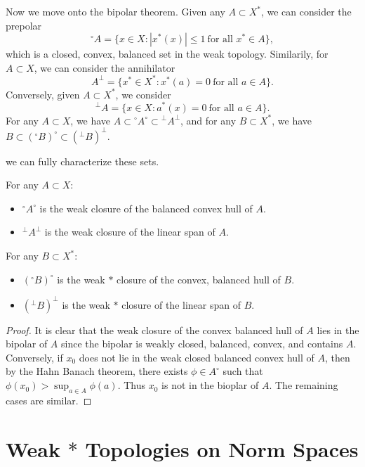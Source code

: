 Now we move onto the bipolar theorem. Given any $A \subset X^*$, we can consider the prepolar
%
\[ {}^\circ A = \{ x \in X : |x^*(x)| \leq 1\ \text{for all $x^* \in A$} \}, \]
%
which is a closed, convex, balanced set in the weak topology. Similarily, for $A \subset X$, we can consider the annihilator
%
\[ A^\perp = \{ x^* \in X^* : x^*(a) = 0\ \text{for all $a \in A$} \}. \]
%
Conversely, given $A \subset X^*$, we consider
%
\[ {}^\perp A = \{ x \in X : a^*(x) = 0\ \text{for all $a \in A$} \}. \]
%
For any $A \subset X$, we have $A \subset {}^\circ A^\circ \subset {}^\perp A^\perp$, and for any $B \subset X^*$, we have $B \subset ({}^\circ B)^{\circ} \subset ({}^\perp B)^{\perp}$.

we can fully characterize these sets.

\begin{theorem}
    For any $A \subset X$:
    \begin{itemize}
        \item ${}^\circ A^\circ$ is the weak closure of the balanced convex hull of $A$.
        \item ${}^\perp A^\perp$ is the weak closure of the linear span of $A$.
    \end{itemize}
    For any $B \subset X^*$:
    \begin{itemize}
        \item $({}^\circ B)^{\circ}$ is the weak $*$ closure of the convex, balanced hull of $B$.
        \item $({}^\perp B)^{\perp}$ is the weak $*$ closure of the linear span of $B$.
    \end{itemize}
\end{theorem}
\begin{proof}
    It is clear that the weak closure of the convex balanced hull of $A$ lies in the bipolar of $A$ since the bipolar is weakly closed, balanced, convex, and contains $A$. Conversely, if $x_0$ does not lie in the weak closed balanced convex hull of $A$, then by the Hahn Banach theorem, there exists $\phi \in A^\circ$ such that $\phi(x_0) > \sup_{a \in A} \phi(a)$. Thus $x_0$ is not in the bioplar of $A$. The remaining cases are similar.
\end{proof}





\section{Weak $*$ Topologies on Norm Spaces}

